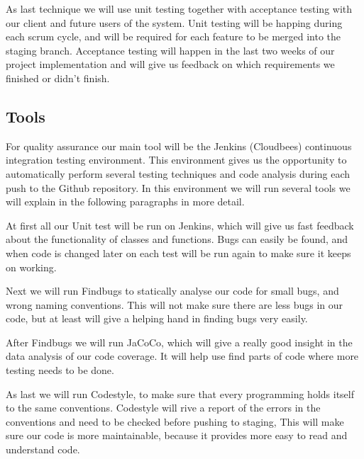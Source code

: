 \documentclass[]{article}
\begin{document}
As last technique we will use unit testing together with acceptance testing with our client and future users of the system.
Unit testing will be happing during each scrum cycle, and will be required for each feature to be merged into the staging branch.
Acceptance testing will happen in the last two weeks of our project implementation and will give us feedback on which requirements we finished or didn't finish.

\subsection{Tools}
For quality assurance our main tool will be the Jenkins (Cloudbees) continuous integration testing environment.
This environment gives us the opportunity to automatically perform several testing techniques and code analysis during each push to the Github repository.
In this environment we will run several tools we will explain in the following paragraphs in more detail.

At first all our Unit test will be run on Jenkins, which will give us fast feedback about the functionality of classes and functions.
Bugs can easily be found, and when code is changed later on each test will be run again to make sure it keeps on working.

Next we will run Findbugs to statically analyse our code for small bugs, and wrong naming conventions.
This will not make sure there are less bugs in our code, but at least will give a helping hand in finding bugs very easily.

After Findbugs we will run JaCoCo, which will give a really good insight in the data analysis of our code coverage.
It will help use find parts of code where more testing needs to be done.

As last we will run Codestyle, to make sure that every programming holds itself to the same conventions.
Codestyle will rive a report of the errors in the conventions and need to be checked before pushing to staging,
This will make sure our code is more maintainable, because it provides more easy to read and understand code.

\newpage


\end{document}

